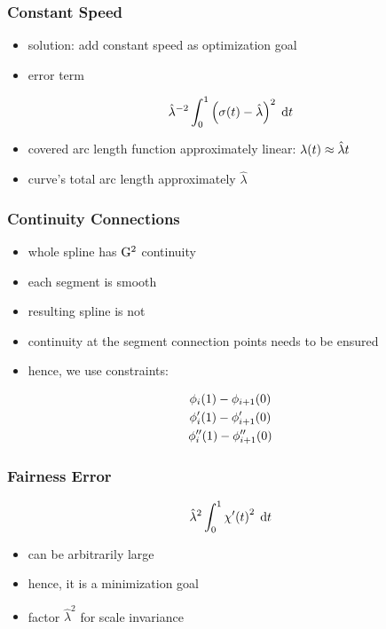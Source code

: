 \documentclass[mathserif]{beamer}
\begin{document}
		\begin{frame}
			\frametitle{Constant Speed}
			\begin{itemize}
				\item solution: add constant speed as optimization goal
				\item error term
			\end{itemize}
			\begin{equation*}
				\hat{\lambda}^{-2}\int_{0}^{1} \left( \sigma\!\left( t \right) - \hat{\lambda} \right)^2 \; \mathrm{d}t
			\end{equation*}
			\begin{itemize}
				\item covered arc length function approximately linear: \(\lambda\!\left( t \right) \approx \hat{\lambda}t\)
				\item curve's total arc length approximately \(\hat{\lambda}\)
			\end{itemize}
		\end{frame}

		\begin{frame}
			\frametitle{Continuity Connections}
			\begin{itemize}
				\item whole spline has \(\mathrm{G}^{2}\) continuity
				\item each segment is smooth
				\item resulting spline is not
				\item continuity at the segment connection points needs to be ensured
				\item hence, we use constraints:
			\end{itemize}
			\begin{equation*}
				\begin{gathered}
					\phi_i\!\left( 1 \right) - \phi_{i + 1}\!\left( 0 \right)\\
					\phi'_i\!\left( 1 \right) - \phi'_{i + 1}\!\left( 0 \right)\\
					\phi''_i\!\left( 1 \right) - \phi''_{i + 1}\!\left( 0 \right)
				\end{gathered}
			\end{equation*}
		\end{frame}

		\begin{frame}
			\frametitle{Fairness Error}
			\begin{equation*}
				\hat{\lambda}^2\int_{0}^{1} \chi'\!\left( t \right)^2 \; \mathrm{d}t
			\end{equation*}
			\begin{itemize}
				\item can be arbitrarily large
				\item hence, it is a minimization goal
				\item factor \(\hat{\lambda}^2\) for scale invariance
			\end{itemize}
		\end{frame}
\end{document}
